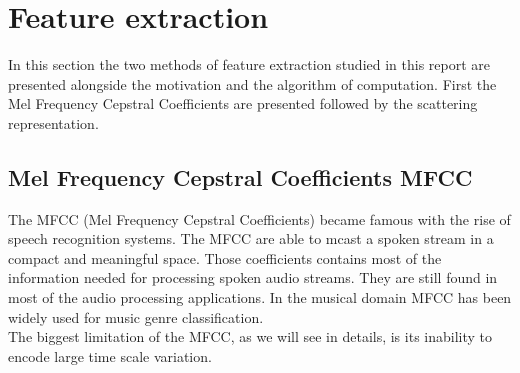 \documentclass[hidelinks,12pt]{report}
\begin{document}
\section{Feature extraction}
In this section the two methods of feature extraction studied in this report are presented alongside the motivation and the algorithm of computation. First the Mel Frequency Cepstral Coefficients are presented followed by the scattering representation. 
\subsection{Mel Frequency Cepstral Coefficients MFCC}
The MFCC (Mel Frequency Cepstral Coefficients)  became famous with the rise of speech recognition systems. The MFCC are able to mcast a spoken stream in a compact and meaningful space. Those coefficients contains most of the information needed for processing spoken audio streams. They are still found in most of the audio processing applications. In the musical domain MFCC has been widely used for music genre classification.\\ The biggest limitation of the MFCC, as we will see in details, is its inability to encode large time scale variation.
\end{document}
